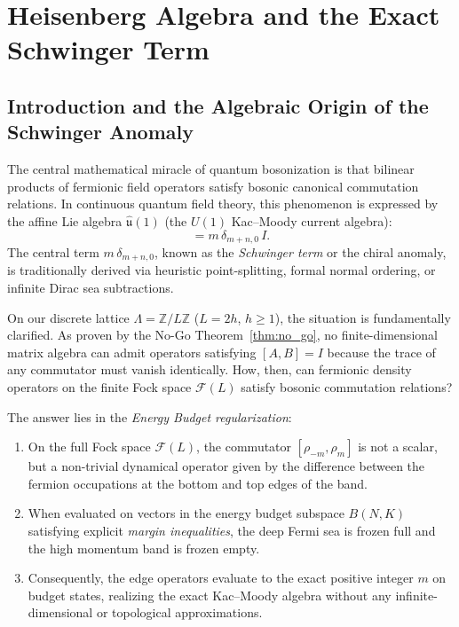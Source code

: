 \chapter{Heisenberg Algebra and the Exact Schwinger Term}
\label{ch:heisenberg_algebra}

\section{Introduction and the Algebraic Origin of the Schwinger Anomaly}

The central mathematical miracle of quantum bosonization is that bilinear products of fermionic field operators satisfy bosonic canonical commutation relations. In continuous quantum field theory, this phenomenon is expressed by the affine Lie algebra $\widehat{\mathfrak{u}}(1)$ (the $U(1)$ Kac--Moody current algebra):
\begin{equation}
[J_m, J_n] = m\, \delta_{m+n, 0}\, I.
\end{equation}
The central term $m\, \delta_{m+n, 0}$, known as the \emph{Schwinger term} or the chiral anomaly, is traditionally derived via heuristic point-splitting, formal normal ordering, or infinite Dirac sea subtractions.

On our discrete lattice $\Lambda = \mathbb{Z}/L\mathbb{Z}$ ($L = 2h$, $h \ge 1$), the situation is fundamentally clarified. 
As proven by the No-Go Theorem~\ref{thm:no_go}, no finite-dimensional matrix algebra can admit operators satisfying $[A, B] = I$ because the trace of any commutator must vanish identically. How, then, can fermionic density operators on the finite Fock space $\mathcal{F}(L)$ satisfy bosonic commutation relations?

\begin{remark}
The answer lies in the \emph{Energy Budget regularization}:
\begin{enumerate}
    \item On the full Fock space $\mathcal{F}(L)$, the commutator $[\rho_{-m}, \rho_m]$ is not a scalar, but a non-trivial dynamical operator given by the difference between the fermion occupations at the bottom and top edges of the band.
    \item When evaluated on vectors in the energy budget subspace $B(N, K)$ satisfying explicit \emph{margin inequalities}, the deep Fermi sea is frozen full and the high momentum band is frozen empty.
    \item Consequently, the edge operators evaluate to the exact positive integer $m$ on budget states, realizing the exact Kac--Moody algebra without any infinite-dimensional or topological approximations.
\end{enumerate}
\end{remark}

